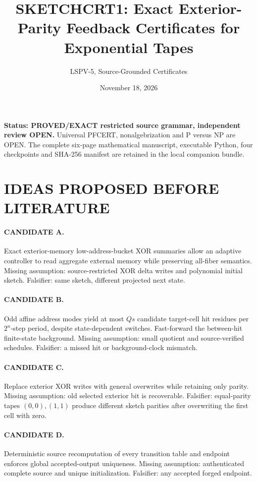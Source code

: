\documentclass[11pt]{article}
\title{SKETCHCRT1: Exact Exterior-Parity Feedback Certificates for Exponential Tapes}
\author{LSPV-5, Source-Grounded Certificates}
\date{November 18, 2026}
\begin{document}
\maketitle
\noindent\textbf{Status: PROVED/EXACT restricted source grammar, independent review OPEN.}
Universal PFCERT, nonalgebrization and P versus NP are OPEN. The complete six-page mathematical manuscript, executable Python, four checkpoints and SHA-256 manifest are retained in the local companion bundle.
\section{IDEAS PROPOSED BEFORE LITERATURE}
\paragraph{CANDIDATE A.} Exact exterior-memory low-address-bucket XOR summaries allow an adaptive controller to read aggregate external memory while preserving all-fiber semantics. Missing assumption: source-restricted XOR delta writes and polynomial initial sketch. Falsifier: same sketch, different projected next state.
\paragraph{CANDIDATE B.} Odd affine address modes yield at most $Qs$ candidate target-cell hit residues per $2^n$-step period, despite state-dependent switches. Fast-forward the between-hit finite-state background. Missing assumption: small quotient and source-verified schedules. Falsifier: a missed hit or background-clock mismatch.
\paragraph{CANDIDATE C.} Replace exterior XOR writes with general overwrites while retaining only parity. Missing assumption: old selected exterior bit is recoverable. Falsifier: equal-parity tapes $(0,0),(1,1)$ produce different sketch parities after overwriting the first cell with zero.
\paragraph{CANDIDATE D.} Deterministic source recomputation of every transition table and endpoint enforces global accepted-output uniqueness. Missing assumption: authenticated complete source and unique initialization. Falsifier: any accepted forged endpoint.
\end{document}
